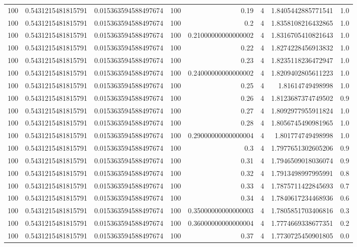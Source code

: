 \documentclass[11pt]{article}
\begin{document}
\begin{center}
\begin{tabular}{rrrrrrrr}
100 & 0.5431215481815791 & 0.015363594588497674 & 100 & 0.19 & 4 & 1.8405442885771541 & 1.0\\
100 & 0.5431215481815791 & 0.015363594588497674 & 100 & 0.2 & 4 & 1.8358108216432865 & 1.0\\
100 & 0.5431215481815791 & 0.015363594588497674 & 100 & 0.21000000000000002 & 4 & 1.8316705410821643 & 1.0\\
100 & 0.5431215481815791 & 0.015363594588497674 & 100 & 0.22 & 4 & 1.8274228456913832 & 1.0\\
100 & 0.5431215481815791 & 0.015363594588497674 & 100 & 0.23 & 4 & 1.8235118236472947 & 1.0\\
100 & 0.5431215481815791 & 0.015363594588497674 & 100 & 0.24000000000000002 & 4 & 1.8209402805611223 & 1.0\\
100 & 0.5431215481815791 & 0.015363594588497674 & 100 & 0.25 & 4 & 1.81614749498998 & 1.0\\
100 & 0.5431215481815791 & 0.015363594588497674 & 100 & 0.26 & 4 & 1.8123687374749502 & 0.9\\
100 & 0.5431215481815791 & 0.015363594588497674 & 100 & 0.27 & 4 & 1.8092977955911824 & 1.0\\
100 & 0.5431215481815791 & 0.015363594588497674 & 100 & 0.28 & 4 & 1.8056745490981965 & 1.0\\
100 & 0.5431215481815791 & 0.015363594588497674 & 100 & 0.29000000000000004 & 4 & 1.801774749498998 & 1.0\\
100 & 0.5431215481815791 & 0.015363594588497674 & 100 & 0.3 & 4 & 1.7977651302605206 & 0.9\\
100 & 0.5431215481815791 & 0.015363594588497674 & 100 & 0.31 & 4 & 1.7946509018036074 & 0.9\\
100 & 0.5431215481815791 & 0.015363594588497674 & 100 & 0.32 & 4 & 1.7913498997995991 & 0.8\\
100 & 0.5431215481815791 & 0.015363594588497674 & 100 & 0.33 & 4 & 1.7875711422845693 & 0.7\\
100 & 0.5431215481815791 & 0.015363594588497674 & 100 & 0.34 & 4 & 1.7840617234468936 & 0.6\\
100 & 0.5431215481815791 & 0.015363594588497674 & 100 & 0.35000000000000003 & 4 & 1.7805851703406816 & 0.3\\
100 & 0.5431215481815791 & 0.015363594588497674 & 100 & 0.36000000000000004 & 4 & 1.7774669338677351 & 0.2\\
100 & 0.5431215481815791 & 0.015363594588497674 & 100 & 0.37 & 4 & 1.7730725450901805 & 0.0\\

\end{tabular}
\end{center}
\end{document}
